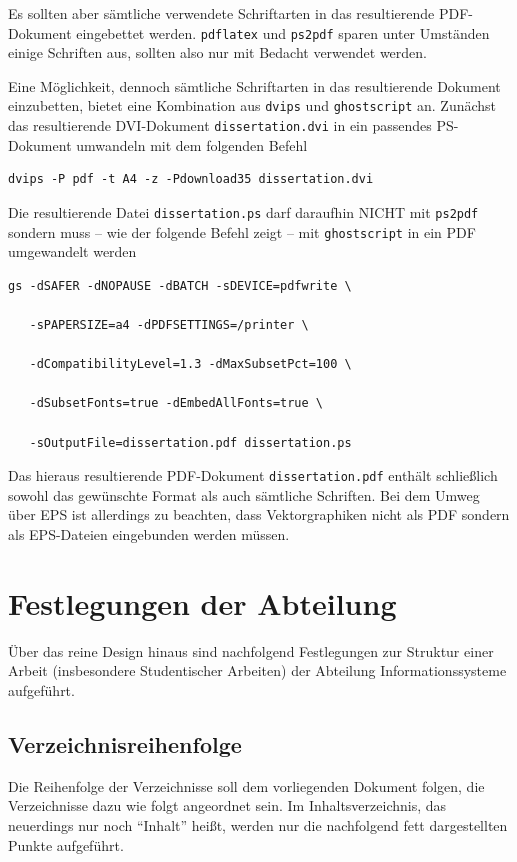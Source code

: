 Es sollten aber s\"{a}mtliche verwendete Schriftarten in das
resultierende PDF-Do\-kument eingebettet werden. \texttt{pdflatex}
und \texttt{ps2pdf} sparen unter Umst\"{a}nden einige Schriften aus, sollten also nur mit Bedacht verwendet werden.

Eine M\"{o}glichkeit, dennoch s\"{a}mtliche Schriftarten in das
resultierende Dokument einzubetten, bietet eine Kombination aus
\texttt{dvips} und \texttt{ghostscript} an. Zun\"{a}chst das
resultierende DVI-Dokument \texttt{dissertation.dvi} in ein
passendes PS-Dokument umwandeln mit dem folgenden Befehl

\begin{verbatim}
dvips -P pdf -t A4 -z -Pdownload35 dissertation.dvi
\end{verbatim}

Die resultierende Datei \texttt{dissertation.ps} darf daraufhin
NICHT mit
\texttt{ps2pdf} sondern muss -- wie der folgende Befehl zeigt --
mit \texttt{ghostscript} in ein PDF umgewandelt werden

\begin{verbatim}
gs -dSAFER -dNOPAUSE -dBATCH -sDEVICE=pdfwrite \

   -sPAPERSIZE=a4 -dPDFSETTINGS=/printer \

   -dCompatibilityLevel=1.3 -dMaxSubsetPct=100 \

   -dSubsetFonts=true -dEmbedAllFonts=true \

   -sOutputFile=dissertation.pdf dissertation.ps
\end{verbatim}

Das hieraus resultierende PDF-Dokument \texttt{dissertation.pdf}
enth\"{a}lt schlie{\ss}lich sowohl das gew\"{u}nschte Format als auch
s\"{a}mtliche Schriften. Bei dem Umweg \"{u}ber EPS ist allerdings zu beachten, dass Vektorgraphiken nicht als PDF sondern als EPS-Dateien eingebunden werden m\"{u}ssen.

\chapter{Festlegungen der Abteilung}
\"{U}ber das reine Design hinaus sind nachfolgend Festlegungen zur
Struktur einer Arbeit (insbesondere Studentischer Arbeiten) der
Abteilung Informationssysteme  aufgef\"{u}hrt.



\section{Verzeichnisreihenfolge}
Die Reihenfolge der Verzeichnisse soll dem vorliegenden Dokument
folgen, die Verzeichnisse dazu wie folgt angeordnet sein. Im
Inhaltsverzeichnis, das neuerdings nur noch "`Inhalt"' hei{\ss}t,
werden nur die nachfolgend fett dargestellten Punkte aufgef\"{u}hrt.

